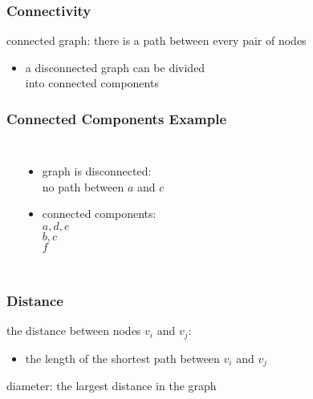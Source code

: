\documentclass[dvipsnames]{beamer}
\begin{document}
\begin{frame}
  \frametitle{Connectivity}

  \begin{definition}
    \alert{connected} graph: there is a path between every pair of nodes
  \end{definition}

  \pause
  \begin{itemize}
    \item a disconnected graph can be divided\\
      into connected components
  \end{itemize}
\end{frame}

\begin{frame}
  \frametitle{Connected Components Example}

  \begin{example}
    \begin{columns}
      \begin{center}
      \end{center}

      \begin{itemize}
        \item graph is disconnected:\\
          no path between $a$ and $c$
        \item connected components:\\
          $a,d,e$\\
          $b,c$\\
          $f$
      \end{itemize}
    \end{columns}
  \end{example}
\end{frame}

\begin{frame}
  \frametitle{Distance}

  \begin{definition}
    the \alert{distance} between nodes $v_i$ and $v_j$:
    \begin{itemize}
      \item the length of the shortest path between $v_i$ and $v_j$
    \end{itemize}
  \end{definition}

  \pause
  \begin{definition}
    \alert{diameter}: the largest distance in the graph
  \end{definition}
\end{frame}
\end{document}
